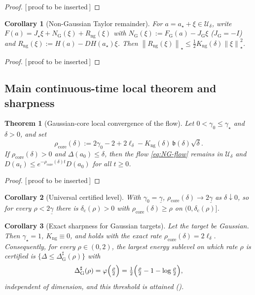 \documentclass[11pt]{article}
\theoremstyle{plain}
\newtheorem{theorem}{Theorem}[section]
\newtheorem{corollary}[corollary]{Corollary}
\theoremstyle{definition}
\theoremstyle{remark}
\newcommand{\Id}{I}
\newcommand{\norm}[1]{\left\lVert #1\right\rVert}
\newcommand{\Ureg}{\mathcal{U}}
\newcommand{\FGauss}{F_{\mathrm G}}
\newcommand{\gstar}{\gamma_\star}
\newcommand{\gund}{\underline{\gamma}}
\newcommand{\sharpthr}{\Delta^{\sharp}}
\newcommand{\Kng}{K_{\mathrm{ng}}}
\newcommand{\PROOFHOLE}{{\color{red}\textsf{[\,proof to be inserted\,]}}}
\begin{document}
\begin{proof}
\PROOFHOLE
\end{proof}

\begin{corollary}[Non-Gaussian Taylor remainder]
\label{cor:taylor-ng}
For $a=a_\star+\xi\in\Ureg_\delta$, write $F(a)=J_\star\xi+N_{\mathrm G}(\xi)+R_{\mathrm{ng}}(\xi)$
with $N_{\mathrm G}(\xi):=\FGauss(a)-J_{\mathrm G}\xi$ ($J_{\mathrm G}=-\Id$) and
$R_{\mathrm{ng}}(\xi):=H(a)-DH(a_\star)\xi$. Then
$\norm{R_{\mathrm{ng}}(\xi)}_\star\leq\tfrac12\Kng(\delta)\norm\xi_\star^2$.
\end{corollary}

\begin{proof}
\PROOFHOLE
\end{proof}

\subsection{Main continuous-time local theorem and sharpness}

\begin{theorem}[Gaussian-core local convergence of the flow]
\label{thm:core-flow}
Let $0<\gamma_0\leq\gstar$ and $\delta>0$, and set
\begin{equation}
\label{eq:rho-core}
    \rho_{\mathrm{core}}(\delta):=2\gamma_0-2+2\ell_\delta-\Kng(\delta)\,\mathfrak b(\delta)\sqrt\delta .
\end{equation}
If $\rho_{\mathrm{core}}(\delta)>0$ and $\Delta(a_0)\leq\delta$, then the flow \eqref{eq:NG-flow}
remains in $\Ureg_\delta$ and $D(a_t)\leq e^{-\rho_{\mathrm{core}}(\delta)t}D(a_0)$ for all $t\geq0$.
\end{theorem}

\begin{proof}
\PROOFHOLE
\end{proof}

\begin{corollary}[Universal certified level]
\label{cor:core-universal}
With $\gamma_0=\gund$, $\rho_{\mathrm{core}}(\delta)\to2\gund$ as $\delta\downarrow0$, so for every
$\rho<2\gund$ there is $\delta_{\mathrm c}(\rho)>0$ with $\rho_{\mathrm{core}}(\delta)\geq\rho$ on
$(0,\delta_{\mathrm c}(\rho)]$.
\end{corollary}

\begin{corollary}[Exact sharpness for Gaussian targets]
\label{cor:gauss-sharp}
Let the target be Gaussian. Then $\gstar=1$, $\Kng\equiv0$, and  holds with the
exact rate $\rho_{\mathrm{core}}(\delta)=2\ell_\delta$. Consequently, for every $\rho\in(0,2)$, the
largest energy sublevel on which rate $\rho$ is certified is $\{\Delta\leq\sharpthr_{\mathrm G}(\rho)\}$
with
\begin{equation}
\label{eq:gauss-sharp-thresh}
    \sharpthr_{\mathrm G}(\rho)=\varphi\Bigl(\tfrac\rho2\Bigr)=\tfrac12\Bigl(\tfrac\rho2-1-\log\tfrac\rho2\Bigr),
\end{equation}
independent of dimension, and this threshold is attained ().
\end{corollary}
\end{document}
